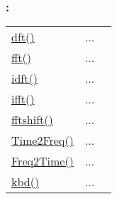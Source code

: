 \subsubsection*{: }

\textcolor{blue}{}\begin{tabular}{>{\raggedleft}p{3cm}>{\centering}p{0.5cm}l}
\textcolor{blue}{\hyperlink{dft}{dft()}}&
...&
 \begin{NoHyper} \nameref{par:Discrete-Fourier-Transform} \end{NoHyper}\tabularnewline
\textcolor{blue}{\hyperlink{fft}{fft()}}&
...&
 \begin{NoHyper} \nameref{par:Fast-Fourier-Transform} \end{NoHyper}\tabularnewline
\textcolor{blue}{\hyperlink{idft}{idft()}}&
...&
 \begin{NoHyper} \nameref{par:Inverse-Discrete-Fourier} \end{NoHyper}\tabularnewline
\textcolor{blue}{\hyperlink{ifft}{ifft()}}&
...&
 \begin{NoHyper} \nameref{par:Inverse-Fast-Fourier} \end{NoHyper}\tabularnewline
\textcolor{blue}{\hyperlink{fftshift}{fftshift()}}&
...&
 \begin{NoHyper} \nameref{par:fftshift} \end{NoHyper}\tabularnewline
\textcolor{blue}{\hyperlink{Time2Freq}{Time2Freq()}}&
...&
 \begin{NoHyper} \nameref{par:Interpreted-Discrete-Fourier-Transform} \end{NoHyper}\tabularnewline
\textcolor{blue}{\hyperlink{Freq2Time}{Freq2Time()}}&
...&
 \begin{NoHyper} \nameref{par:Interpreted-Inverse-Discrete-Fourier} \end{NoHyper}\tabularnewline
\textcolor{blue}{\hyperlink{kbd}{kbd()}}&
...&
 \begin{NoHyper} \nameref{par:Kaiser-Bessel-window} \end{NoHyper}\tabularnewline
\end{tabular}




\subsubsection*{}

